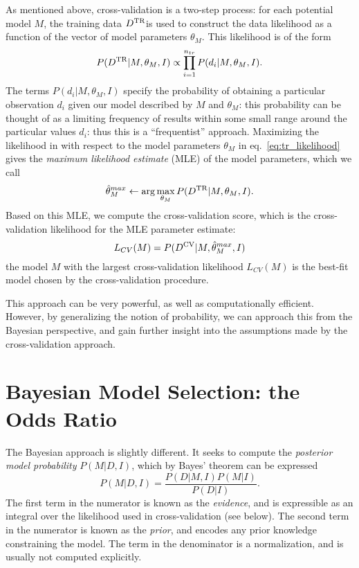 \documentclass[12pt]{article}
\newcommand{\Dtr}{\ensuremath{D^{\rm TR}}}
\newcommand{\Dcv}{\ensuremath{D^{\rm CV}}}
\newcommand{\eqn}[1]{eq.~\ref{eq:#1}}
\begin{document}
As mentioned above, cross-validation is a two-step process:
for each potential model $M$, the
training data \Dtr is used to construct the data likelihood as a function
of the vector of model parameters $\theta_M$.  This likelihood is of the form
\begin{equation}
  \label{eq:tr_likelihood}
  P(\Dtr|M, \theta_M, I) \propto \prod_{i=1}^{n_{tr}}P(d_i|M, \theta_M, I).
\end{equation}
The terms $P(d_i|M, \theta_M, I)$ specify the probability of obtaining a
particular observation $d_i$ given our model described by $M$ and $\theta_M$:
this probability can be thought of as a limiting frequency of results within
some small range around the particular values $d_i$: thus this is a
``frequentist'' approach.
Maximizing the likelihood in with respect to the model parameters $\theta_M$
in \eqn{tr_likelihood} gives the {\it maximum likelihood estimate} (MLE)
of the model parameters, which we call
\begin{equation}
  \hat{\theta}_M^{max} \leftarrow \arg\max_{\theta_M} P(\Dtr|M, \theta_M, I).
\end{equation}
Based on this MLE, we compute the cross-validation score, which is the
cross-validation likelihood for the MLE parameter estimate:
\begin{equation}
  L_{CV}(M) = P(\Dcv|M, \hat{\theta}_M^{max}, I)
\end{equation}
the model $M$ with the largest cross-validation likelihood $L_{CV}(M)$ is the
best-fit model chosen by the cross-validation procedure.

This approach can be very powerful, as well as computationally efficient.
However, by generalizing the notion of probability, we can approach this
from the Bayesian perspective, and gain further insight into the assumptions
made by the cross-validation approach.

\section{Bayesian Model Selection: the Odds Ratio}
The Bayesian approach is slightly different.  It seeks to compute the
{\it posterior model probability} $P(M|D,I)$, which by Bayes' theorem
can be expressed
\begin{equation}
  \label{eq:bayes_theorem}
  P(M|D,I) = \frac{P(D|M,I)P(M|I)}{P(D|I)}.
\end{equation}
The first term in the numerator is known as the {\it evidence},
and is expressible as an integral over the likelihood used
in cross-validation (see below).
The second term in the numerator is known
as the {\it prior}, and encodes any prior knowledge constraining the model.
The term in the denominator is a normalization, and is usually not
computed explicitly.
\end{document}

